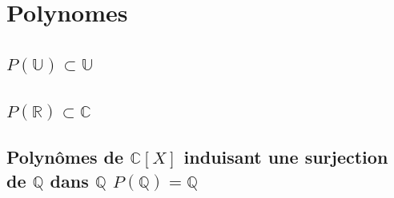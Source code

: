 
\section{Polynomes}
\subsection{$P(\mathbb{U})\subset \mathbb{U}$}
\subsection{$P(\mathbb{R}) \subset \mathbb{C}$}
\subsection{Polynômes de $\mathbb{C}[X]$ induisant une surjection de $\mathbb{Q}$ dans $\mathbb{Q}$ $P(\mathbb{Q}) = \mathbb{Q}$}

